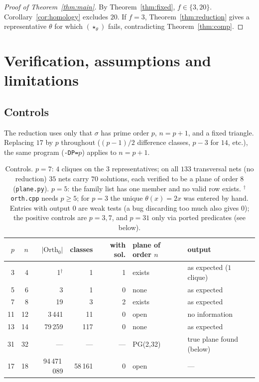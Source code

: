 \documentclass[11pt,a4paper]{article}
\theoremstyle{definition}
\newcommand{\Orth}{\mathrm{Orth}}
\begin{document}
\begin{proof}[Proof of Theorem~\ref{thm:main}]
By Theorem~\ref{thm:fixed}, $f\in\{3,20\}$. Corollary~\ref{cor:homology} excludes $20$. If $f=3$, Theorem~\ref{thm:reduction} gives a representative $\theta$ for which $(\star_\theta)$ fails, contradicting Theorem~\ref{thm:comp}.
\end{proof}

\section{Verification, assumptions and limitations}\label{sec:verification}

\subsection{Controls}
The reduction uses only that $\sigma$ has prime order $p$, $n=p+1$, and a fixed triangle. Replacing $17$ by $p$ throughout ($(p-1)/2$ difference classes, $p-3$ for $14$, etc.), the same program (\texttt{-DP=$p$}) applies to $n=p+1$.

\begin{table}[ht]
\centering\small
\begin{tabular}{rrrrrll}
\toprule
$p$ & $n$ & $|\Orth_0|$ & classes & with sol. & plane of order $n$ & output\\
\midrule
3 & 4 & 1$^{\dagger}$ & 1 & 1 & exists & as expected ($1$ clique)\\
5 & 6 & 3 & 1 & 0 & none & as expected\\
7 & 8 & 19 & 3 & 2 & exists & as expected\\
11 & 12 & 3\,441 & 11 & 0 & open & no information\\
13 & 14 & 79\,259 & 117 & 0 & none & as expected\\
31 & 32 & --- & --- & --- & PG(2,32) & true plane found (below)\\
\midrule
17 & 18 & 94\,471\,089 & 58\,161 & 0 & open & ---\\
\bottomrule
\end{tabular}
\caption{Controls. $p=7$: $4$ cliques on the $3$ representatives; on all $133$ transversal nets (no reduction) $35$ nets carry $70$ solutions, each verified to be a plane of order $8$ (\texttt{plane.py}). $p=5$: the family list has one member and no valid row exists. $^{\dagger}$\texttt{orth.cpp} needs $p\ge5$; for $p=3$ the unique $\theta(x)=2x$ was entered by hand. Entries with output $0$ are weak tests (a bug discarding too much also gives $0$); the positive controls are $p=3,7$, and $p=31$ only via ported predicates (see below).}\label{tab:controls}
\end{table}
\end{document}
